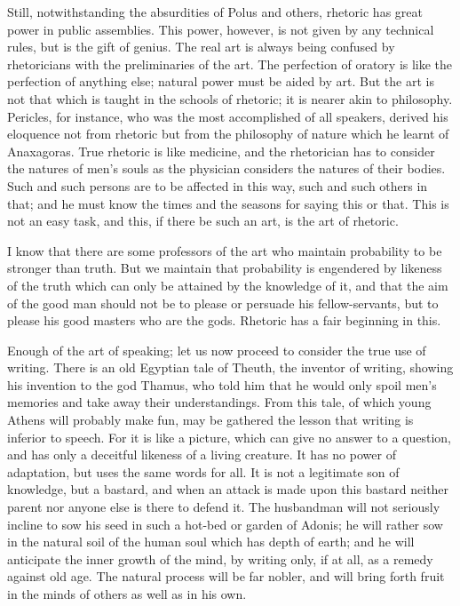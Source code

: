 \documentclass[11pt,letter]{article}
\begin{document}
\par  Still, notwithstanding the absurdities of Polus and others, rhetoric has great power in public assemblies. This power, however, is not given by any technical rules, but is the gift of genius. The real art is always being confused by rhetoricians with the preliminaries of the art. The perfection of oratory is like the perfection of anything else; natural power must be aided by art. But the art is not that which is taught in the schools of rhetoric; it is nearer akin to philosophy. Pericles, for instance, who was the most accomplished of all speakers, derived his eloquence not from rhetoric but from the philosophy of nature which he learnt of Anaxagoras. True rhetoric is like medicine, and the rhetorician has to consider the natures of men's souls as the physician considers the natures of their bodies. Such and such persons are to be affected in this way, such and such others in that; and he must know the times and the seasons for saying this or that. This is not an easy task, and this, if there be such an art, is the art of rhetoric.

\par  I know that there are some professors of the art who maintain probability to be stronger than truth. But we maintain that probability is engendered by likeness of the truth which can only be attained by the knowledge of it, and that the aim of the good man should not be to please or persuade his fellow-servants, but to please his good masters who are the gods. Rhetoric has a fair beginning in this.

\par  Enough of the art of speaking; let us now proceed to consider the true use of writing. There is an old Egyptian tale of Theuth, the inventor of writing, showing his invention to the god Thamus, who told him that he would only spoil men's memories and take away their understandings. From this tale, of which young Athens will probably make fun, may be gathered the lesson that writing is inferior to speech. For it is like a picture, which can give no answer to a question, and has only a deceitful likeness of a living creature. It has no power of adaptation, but uses the same words for all. It is not a legitimate son of knowledge, but a bastard, and when an attack is made upon this bastard neither parent nor anyone else is there to defend it. The husbandman will not seriously incline to sow his seed in such a hot-bed or garden of Adonis; he will rather sow in the natural soil of the human soul which has depth of earth; and he will anticipate the inner growth of the mind, by writing only, if at all, as a remedy against old age. The natural process will be far nobler, and will bring forth fruit in the minds of others as well as in his own.
\end{document}
